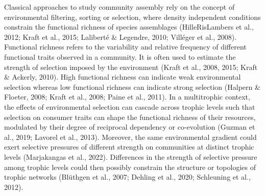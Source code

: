 \documentclass[
]{agujournal2019}
\begin{document}
Classical approaches to study community assembly rely on the concept of
environmental filtering, sorting or selection, where density independent
conditions constrain the functional richness of species assemblages
(HilleRisLambers et al., 2012; Kraft et al., 2015; Laliberté \&
Legendre, 2010; Villéger et al., 2008). Functional richness refers to
the variability and relative frequency of different functional traits
observed in a community. It is often used to estimate the strength of
selection imposed by the environment (Kraft et al., 2008, 2015; Kraft \&
Ackerly, 2010). High functional richness can indicate weak environmental
selection whereas low functional richness can indicate strong selection
(Halpern \& Floeter, 2008; Kraft et al., 2008; Paine et al., 2011). In a
multitrophic context, the effects of environmental selection can cascade
across trophic levels such that selection on consumer traits can shape
the functional richness of their resources, modulated by their degree of
reciprocal dependency or co-evolution (Guzman et al., 2019; Lavorel et
al., 2013). Moreover, the same environmental gradient could exert
selective pressures of different strength on communities at distinct
trophic levels (Marjakangas et al., 2022). Differences in the strength
of selective pressure among trophic levels could then possibly constrain
the structure or topologies of trophic networks (Blüthgen et al., 2007;
Dehling et al., 2020; Schleuning et al., 2012).
\end{document}

